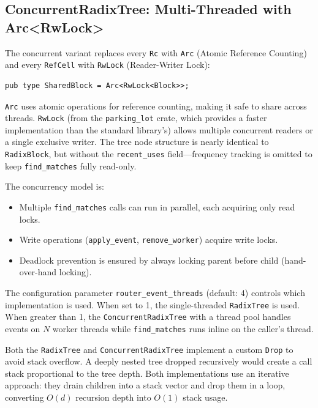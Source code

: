 \subsection{ConcurrentRadixTree: Multi-Threaded with Arc<RwLock>}

The concurrent variant replaces every \texttt{Rc} with \texttt{Arc} (Atomic Reference Counting) and every \texttt{RefCell} with \texttt{RwLock} (Reader-Writer Lock):

\begin{verbatim}
pub type SharedBlock = Arc<RwLock<Block>>;
\end{verbatim}

\texttt{Arc} uses atomic operations for reference counting, making it safe to share across threads. \texttt{RwLock} (from the \texttt{parking\_lot} crate, which provides a faster implementation than the standard library's) allows multiple concurrent readers or a single exclusive writer. The tree node structure is nearly identical to \texttt{RadixBlock}, but without the \texttt{recent\_uses} field---frequency tracking is omitted to keep \texttt{find\_matches} fully read-only.

The concurrency model is:
\begin{itemize}
  \item Multiple \texttt{find\_matches} calls can run in parallel, each acquiring only read locks.
  \item Write operations (\texttt{apply\_event}, \texttt{remove\_worker}) acquire write locks.
  \item Deadlock prevention is ensured by always locking parent before child (hand-over-hand locking).
\end{itemize}

The configuration parameter \texttt{router\_event\_threads} (default: 4) controls which implementation is used. When set to 1, the single-threaded \texttt{RadixTree} is used. When greater than 1, the \texttt{ConcurrentRadixTree} with a thread pool handles events on $N$ worker threads while \texttt{find\_matches} runs inline on the caller's thread.

\begin{notebox}
Both the \texttt{RadixTree} and \texttt{ConcurrentRadixTree} implement a custom \texttt{Drop} to avoid stack overflow. A deeply nested tree dropped recursively would create a call stack proportional to the tree depth. Both implementations use an iterative approach: they drain children into a stack vector and drop them in a loop, converting $O(d)$ recursion depth into $O(1)$ stack usage.
\end{notebox}

